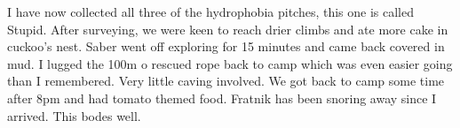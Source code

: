 I have now collected all three of the hydrophobia pitches, this one is called Stupid. After surveying, we were keen to reach drier climbs and ate more cake in cuckoo's nest. Saber went off exploring for 15 minutes and came back covered in mud. I lugged the 100m o rescued rope back to camp which was even easier going than I remembered. Very little caving involved. We got back to camp some time after 8pm and had tomato themed food. Fratnik has been snoring away since I arrived. This bodes well.



